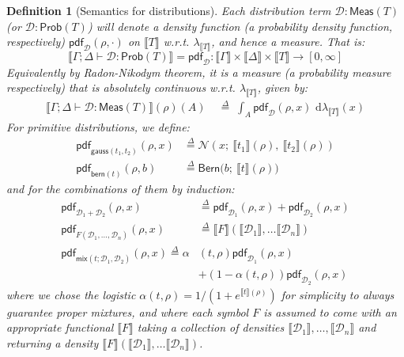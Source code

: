 \documentclass[preprint]{uai2026} %
\newtheorem{definition}{Definition}
\newcommand{\sem}[1]{\llbracket #1 \rrbracket}
\newcommand{\unsafevdash}{\vdash_{\text{u}}}
\newcommand{\df}{\overset{\Delta}{=}}
\newcommand{\gauss}[2]{\mathsf{gauss}(#1,#2)}
\newcommand{\bern}[1]{\mathsf{bern}(#1)}
\newcommand{\dirac}[1]{\delta(#1)}
\newcommand{\mix}[3]{\mathsf{mix}(#1;#2,#3)}
\newcommand{\dplus}[2]{#1 + #2}
\newcommand{\Meas}{\mathsf{Meas}}
\newcommand{\Prob}{\mathsf{Prob}}
\newcommand{\pdf}{\mathsf{pdf}}
\newcommand{\dd}{\,\mathrm{d}}
\begin{document}
\begin{definition}[Semantics for distributions]\label{def:sem-dist}
Each distribution term $\mathcal{D}: \Meas(T)$ (or $\mathcal{D}: \Prob(T)$) will denote a density function (a probability density function, respectively) $\pdf_{\mathcal{D}}(\rho,\cdot)$ on $\sem{T}$ w.r.t. $\lambda_{\sem{T}}$, and hence a measure. That is:\[
\sem{\Gamma;\Delta \vdash \mathcal{D}:\Prob(T)} = \pdf_{\mathcal{D}} : \sem{\Gamma}\times\sem{\Delta}\times\sem{T} \to [0, \infty]
\]
Equivalently by Radon-Nikodym theorem, it is a measure (a probability measure respectively) that is absolutely continuous w.r.t. $\lambda_{\sem{T}}$, given by:
\begin{align*}
\sem{\Gamma;\Delta \vdash \mathcal{D}:\Meas(T)}(\rho)(A)
\;&\df\;
\int_A \pdf_{\mathcal{D}}(\rho,x)\, \dd\lambda_{\sem{T}}(x)
\end{align*}
For primitive distributions, we define:
\begin{align*}
\pdf_{\gauss{t_1}{t_2}}(\rho,x) &\df \mathcal{N}\left(x;\ \sem{t_1}(\rho),\ \sem{t_2}(\rho)\right) \\
\pdf_{\bern{t}}(\rho,b) &\df \mathsf{Bern}\big(b;\ \sem{t}(\rho)\big)
\end{align*}
and for the combinations of them by induction:
\begin{align*}
\pdf_{\mathcal{D}_1 + \mathcal{D}_2}(\rho,x) &\df \pdf_{\mathcal{D}_1}(\rho,x) + \pdf_{\mathcal{D}_2}(\rho,x) \\
\pdf_{F(\mathcal{D}_1,\ldots,\mathcal{D}_n)}(\rho,x) &\df \sem{F}(\sem{\mathcal{D}_1},\ldots\sem{\mathcal{D}_n})\\
\pdf_{\mix{t}{\mathcal{D}_1}{\mathcal{D}_2}}(\rho,x) \df \alpha&(t, \rho)\pdf_{\mathcal{D}_1}(\rho,x)\\
&+ (1 - \alpha(t, \rho))\pdf_{\mathcal{D}_2}(\rho,x)
\end{align*}
where we chose the logistic $\alpha(t, \rho) = 1/(1 + e^{\sem{t}(\rho)})$ for simplicity to always guarantee proper mixtures, and where each symbol $F$ is assumed to come with an appropriate functional $\sem{F}$ taking a collection of densities $\sem{\mathcal{D}_1}, \ldots, \sem{\mathcal{D}_n}$ and returning a density $\sem{F}(\sem{\mathcal{D}_1},\ldots\sem{\mathcal{D}_n})$.
\end{definition}
\end{document}
